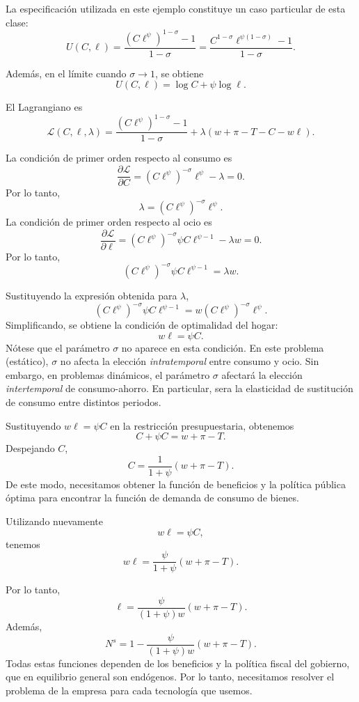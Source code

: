 \documentclass[11pt]{article}
\begin{document}
La especificación utilizada en este ejemplo constituye un caso particular de esta clase:
\[
U(C,\ell)
=
\frac{
\left(C\ell^\psi\right)^{1-\sigma}-1
}{
1-\sigma
}
=
\frac{
C^{1-\sigma}\ell^{\psi(1-\sigma)}-1
}{
1-\sigma
}.
\]

Además, en el límite cuando $\sigma\rightarrow1$, se obtiene
\[
U(C,\ell)
=
\log C+\psi\log\ell.
\]

El Lagrangiano es
\[
\mathcal{L}(C,\ell,\lambda)
=
\frac{
\left(C\ell^\psi\right)^{1-\sigma}-1
}{
1-\sigma
}
+
\lambda
\left(
w+\pi-T-C-w\ell
\right).
\]

La condición de primer orden respecto al consumo es
\[
\frac{\partial\mathcal{L}}{\partial C}
=
\left(C\ell^\psi\right)^{-\sigma}\ell^\psi
-\lambda
=
0.
\]
Por lo tanto,
\[
\lambda
=
\left(C\ell^\psi\right)^{-\sigma}\ell^\psi.
\]
La condición de primer orden respecto al ocio es
\[
\frac{\partial\mathcal{L}}{\partial \ell}
=
\left(C\ell^\psi\right)^{-\sigma}
\psi C\ell^{\psi-1}
-\lambda w
=
0.
\]
Por lo tanto,
\[
\left(C\ell^\psi\right)^{-\sigma}
\psi C\ell^{\psi-1}
=
\lambda w.
\]

Sustituyendo la expresión obtenida para $\lambda$,
\[
\left(C\ell^\psi\right)^{-\sigma}
\psi C\ell^{\psi-1}
=
w
\left(C\ell^\psi\right)^{-\sigma}
\ell^\psi.
\]
Simplificando, se obtiene la condición de optimalidad del hogar:
\[
\boxed{
w\ell=\psi C
}.
\]
Nótese que el parámetro $\sigma$ no aparece en esta condición. En este problema (estático), $\sigma$ no afecta la elección \textit{intratemporal} entre consumo y ocio. Sin embargo, en problemas dinámicos, el parámetro $\sigma$ afectará la elección \textit{intertemporal} de consumo-ahorro. En particular, sera la elasticidad de sustitución de consumo entre distintos periodos.

Sustituyendo $w\ell=\psi C$ en la restricción presupuestaria, obtenemos
\[
C+\psi C=w+\pi-T.
\]
Despejando $C$, 
\[
\boxed{
C
=
\frac{1}{1+\psi}
\left(
w+\pi-T
\right)
}.
\]
De este modo, necesitamos obtener la función de beneficios y la política pública óptima para encontrar la función de demanda de consumo de bienes.

Utilizando nuevamente
\[
w\ell=\psi C,
\]
tenemos
\[
w\ell
=
\frac{\psi}{1+\psi}
\left(
w+\pi-T
\right).
\]

Por lo tanto,
\[
\boxed{
\ell
=
\frac{\psi}{(1+\psi)w}
\left(
w+\pi-T
\right)
}.
\]
Además,
\[
\boxed{
N^s
=
1-
\frac{\psi}{(1+\psi)w}
\left(
w+\pi-T
\right)
}.
\]
Todas estas funciones dependen de los beneficios y la política fiscal del gobierno, que en equilibrio general son endógenos. Por lo tanto, necesitamos resolver el problema de la empresa para cada tecnología que usemos.
\end{document}
